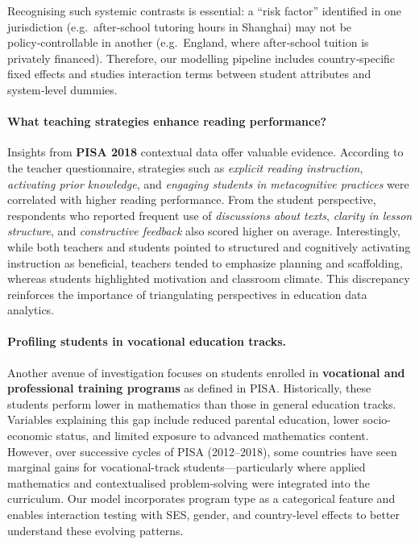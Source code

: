Recognising such systemic contrasts is essential: a “risk factor” identified in one jurisdiction (e.g.\ after‑school tutoring hours in Shanghai) may not be policy‑controllable in another (e.g.\ England, where after‑school tuition is privately financed).  Therefore, our modelling pipeline includes country‑specific fixed effects and studies interaction terms between student attributes and system‑level dummies.

\paragraph{What teaching strategies enhance reading performance?}
Insights from \textbf{PISA 2018} contextual data offer valuable evidence. According to the teacher questionnaire, strategies such as \emph{explicit reading instruction}, \emph{activating prior knowledge}, and \emph{engaging students in metacognitive practices} were correlated with higher reading performance. From the student perspective, respondents who reported frequent use of \emph{discussions about texts}, \emph{clarity in lesson structure}, and \emph{constructive feedback} also scored higher on average. Interestingly, while both teachers and students pointed to structured and cognitively activating instruction as beneficial, teachers tended to emphasize planning and scaffolding, whereas students highlighted motivation and classroom climate. This discrepancy reinforces the importance of triangulating perspectives in education data analytics.

\paragraph{Profiling students in vocational education tracks.}
Another avenue of investigation focuses on students enrolled in \textbf{vocational and professional training programs} as defined in PISA. Historically, these students perform lower in mathematics than those in general education tracks. Variables explaining this gap include reduced parental education, lower socio-economic status, and limited exposure to advanced mathematics content. However, over successive cycles of PISA (2012–2018), some countries have seen marginal gains for vocational-track students—particularly where applied mathematics and contextualised problem-solving were integrated into the curriculum. Our model incorporates program type as a categorical feature and enables interaction testing with SES, gender, and country-level effects to better understand these evolving patterns.


